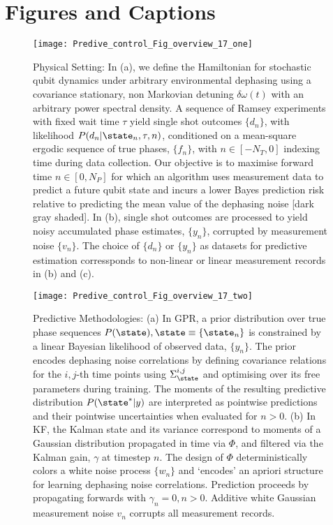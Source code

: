 
\section{Figures and Captions}

\begin{figure}[h!]
    \texttt{[image: Predive\_control\_Fig\_overview\_17\_one]} 
    \caption{ \label{fig:main:Predive_control_Fig_overview_17_one} Physical Setting: In (a), we define the Hamiltonian for stochastic qubit dynamics under arbitrary environmental dephasing using a covariance stationary, non Markovian detuning $\delta \omega(t)$ with an arbitrary power spectral density. A sequence of Ramsey experiments with fixed wait time $\tau$ yield single shot outcomes $\{ d_n \}$, with likelihood $P(d_n|\state_n, \tau,n)$,  conditioned on a mean-square ergodic sequence of true phases, $\{ f_n\}$, with $n \in [-N_T, 0]$ indexing time during data collection. Our objective is to maximise forward time $n \in [0, N_P]$ for which an algorithm uses measurement data to predict a future qubit state and incurs a lower Bayes prediction risk relative to predicting the mean value of the dephasing noise [dark gray shaded]. In (b), single shot outcomes are processed to yield noisy accumulated phase estimates, $\{ y_n\}$, corrupted by measurement noise $\{v_n\}$. The choice of $\{d_n\}$ or $\{y_n\}$ as datasets for predictive estimation corressponds to non-linear or linear measurement records in (b) and (c).}
\end{figure} 

\clearpage \newpage

\begin{widetext}
\begin{figure*}
    \texttt{[image: Predive\_control\_Fig\_overview\_17\_two]} 
    \caption{ \label{fig:main:Predive_control_Fig_overview_17_two} Predictive Methodologies: (a) In GPR, a prior  distribution over true phase sequences $P(\state), \state \equiv \{ \state_n \}$ is constrained by a linear Bayesian likelihood of observed data, $\{ y_n\}$. The prior encodes dephasing noise correlations by defining covariance relations for the $i, j$-th time points using  $\Sigma_\state^{i, j}$ and optimising over its free parameters during training. The moments of the resulting predictive distribution $P(\state^*|y)$ are interpreted as pointwise predictions and their pointwise uncertainties when evaluated for $n>0$.  (b) In KF, the Kalman state and its variance correspond to moments of a Gaussian distribution propagated in time via $\Phi$, and filtered via the Kalman gain, $\gamma$ at timestep $n$. The design of $\Phi$ deterministically colors a white noise process $\{w_n \}$ and `encodes' an apriori structure for learning dephasing noise correlations. Prediction proceeds by propagating forwards with $\gamma_n=0, n>0$. Additive white Gaussian measurement noise $v_n$ corrupts all measurement records.}
\end{figure*}
\end{widetext}

